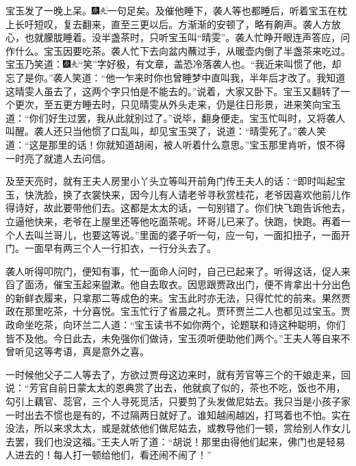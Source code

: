 宝玉发了一晚上呆。{\includegraphics[width=3mm]{../Images/00004}\includegraphics[width=3mm]{../Images/00012}\footnotesize \kaishu 一句足矣。}及催他睡下，袭人等也都睡后，听着宝玉在枕上长吁短叹，复去翻来，直至三更以后。方渐渐的安顿了，略有齁声。袭人方放心，也就朦胧睡着。没半盏茶时，只听宝玉叫“晴雯”。袭人忙睁开眼连声答应，问作什么。宝玉因要吃茶。袭人忙下去向盆内蘸过手，从暖壶内倒了半盏茶来吃过。宝玉乃笑道：{\includegraphics[width=3mm]{../Images/00004}\includegraphics[width=3mm]{../Images/00012}\footnotesize \kaishu “笑”字好极，有文章，盖恐冷落袭人也。}“我近来叫惯了他，却忘了是你。”袭人笑道：“他一乍来时你也曾睡梦中直叫我，半年后才改了。我知道这晴雯人虽去了，这两个字只怕是不能去的。”说着，大家又卧下。宝玉又翻转了一个更次，至五更方睡去时，只见晴雯从外头走来，仍是往日形景，进来笑向宝玉道：“你们好生过罢，我从此就别过了。”说毕，翻身便走。宝玉忙叫时，又将袭人叫醒。袭人还只当他惯了口乱叫，却见宝玉哭了，说道：“晴雯死了。”袭人笑道：“这是那里的话！你就知道胡闹，被人听着什么意思。”宝玉那里肯听，恨不得一时亮了就遣人去问信。

及至天亮时，就有王夫人房里小丫头立等叫开前角门传王夫人的话：“即时叫起宝玉，快洗脸，换了衣裳快来，因今儿有人请老爷寻秋赏桂花，老爷因喜欢他前儿作得诗好，故此要带他们去。这都是太太的话，一句别错了。你们快飞跑告诉他去，立逼他快来，老爷在上屋里还等他吃面茶呢。环哥儿已来了。快跑，快跑。再着一个人去叫兰哥儿，也要这等说。”里面的婆子听一句，应一句，一面扣扭子，一面开门。一面早有两三个人一行扣衣，一行分头去了。

袭人听得叩院门，便知有事，忙一面命人问时，自己已起来了。听得这话，促人来舀了面汤，催宝玉起来盥漱。他自去取衣。因思跟贾政出门，便不肯拿出十分出色的新鲜衣履来，只拿那二等成色的来。宝玉此时亦无法，只得忙忙的前来。果然贾政在那里吃茶，十分喜悦。宝玉忙行了省晨之礼。贾环贾兰二人也都见过宝玉。贾政命坐吃茶，向环兰二人道：“宝玉读书不如你两个，论题联和诗这种聪明，你们皆不及他。今日此去，未免强你们做诗，宝玉须听便助他们两个。”王夫人等自来不曾听见这等考语，真是意外之喜。

一时候他父子二人等去了，方欲过贾母这边来时，就有芳官等三个的干娘走来，回说：“芳官自前日蒙太太的恩典赏了出去，他就疯了似的，茶也不吃，饭也不用，勾引上藕官、蕊官，三个人寻死觅活，只要剪了头发做尼姑去。我只当是小孩子家一时出去不惯也是有的，不过隔两日就好了。谁知越闹越凶，打骂着也不怕。实在没法，所以来求太太，或是就依他们做尼姑去，或教导他们一顿，赏给别人作女儿去罢，我们也没这福。”王夫人听了道：“胡说！那里由得他们起来，佛门也是轻易人进去的！每人打一顿给他们，看还闹不闹了！”

